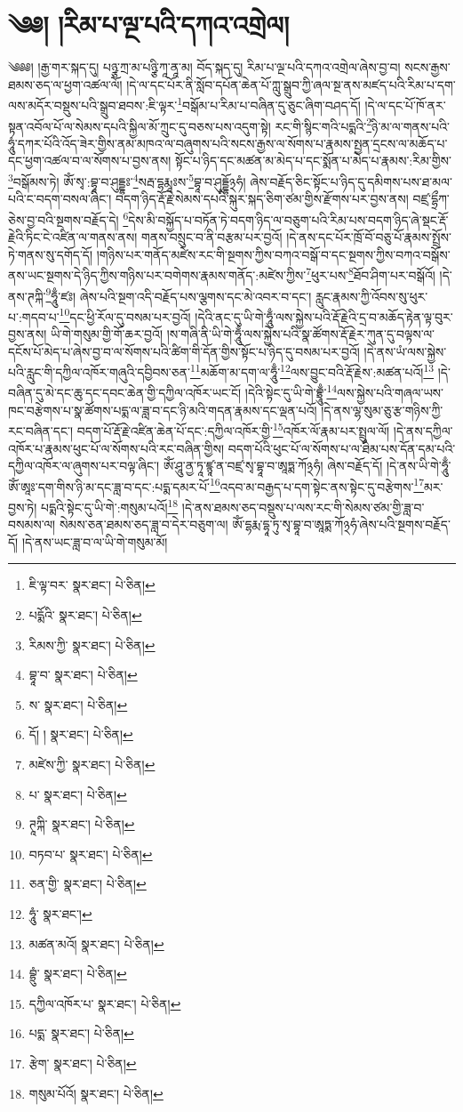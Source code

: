 \setcounter{footnote}{0} 
\chapter{༄༅། །རིམ་པ་ལྔ་པའི་དཀའ་འགྲེལ།}༄༅༅། །རྒྱ་གར་སྐད་དུ། པཉྩ་ཀྲ་མ་པཉྩི་ཀཱ་ནཱ་མ། བོད་སྐད་དུ། རིམ་པ་ལྔ་པའི་དཀའ་འགྲེལ་ཞེས་བྱ་བ། སངས་རྒྱས་ཐམས་ཅད་ལ་ཕྱག་འཚལ་ལོ། །དེ་ལ་དང་པོར་ནི་སློབ་དཔོན་ཆེན་པོ་ཀླུ་སྒྲུབ་ཀྱི་ཞལ་སྔ་ནས་མཛད་པའི་རིམ་པ་དག་ལས་མདོར་བསྡུས་པའི་སྒྲུབ་ཐབས་:ཇི་ལྟར་\footnote{ཇི་ལྟ་བར་  སྣར་ཐང་།  པེ་ཅིན། }བསྒོམ་པ་རིམ་པ་བཞིན་དུ་ཅུང་ཞིག་བཤད་དོ། །དེ་ལ་དང་པོ་ཁོ་ནར་སྟན་འབོལ་པོ་ལ་སེམས་དཔའི་སྐྱིལ་མོ་ཀྲུང་དུ་བཅས་པས་འདུག་སྟེ། རང་གི་སྙིང་གའི་པདྨའི་\footnote{པདྨོའི་  སྣར་ཐང་།  པེ་ཅིན། }ཉི་མ་ལ་གནས་པའི་ཧཱུཾ་དཀར་པོའི་འོད་ཟེར་གྱིས་ནམ་མཁའ་ལ་བཞུགས་པའི་སངས་རྒྱས་ལ་སོགས་པ་རྣམས་སྤྱན་དྲངས་ལ་མཆོད་པ་དང་ཕྱག་འཚལ་བ་ལ་སོགས་པ་བྱས་ནས། སྟོང་པ་ཉིད་དང་མཚན་མ་མེད་པ་དང་སྨོན་པ་མེད་པ་རྣམས་:རིམ་གྱིས་\footnote{རིམས་ཀྱི་  སྣར་ཐང་།  པེ་ཅིན། }བསྒོམས་ཏེ། ཨོཾ་སྭ་:བྷཱ་བ་ཤུདྡྷཿ་\footnote{བྷཱ་བ་  སྣར་ཐང་།  པེ་ཅིན། }སརྦ་དྷརྨཱཿས་\footnote{ས་  སྣར་ཐང་།  པེ་ཅིན། }བྷཱ་བ་ཤུདྡྷོ྅ཧཾ། ཞེས་བརྗོད་ཅིང་སྟོང་པ་ཉིད་དུ་དམིགས་པས་ཐ་མལ་པའི་ང་བདག་བསལ་ཞིང་། བདག་ཉིད་རྡོ་རྗེ་སེམས་དཔའི་སྐུར་སྐད་ཅིག་ཙམ་གྱིས་རྫོགས་པར་བྱས་ནས། བཛྲ་དྷྲྀཀ་ཅེས་བྱ་བའི་སྔགས་བརྗོད་དེ། \footnote{དོ། །   སྣར་ཐང་།  པེ་ཅིན། }དེས་མི་བསྐྱོད་པ་བཏོན་ཏེ་བདག་ཉིད་ལ་བཅུག་པའི་རིམ་པས་བདག་ཉིད་ཞེ་སྡང་རྡོ་རྗེའི་ཏིང་ངེ་འཛིན་ལ་གནས་ནས། གནས་བསྲུང་བ་ནི་བརྩམ་པར་བྱའོ། །དེ་ནས་དང་པོར་ཁྲོ་བོ་བཅུ་པོ་རྣམས་སྤྲོས་ཏེ་གནས་སུ་དགོད་དོ། །གཉིས་པར་གནོད་མཛེས་རང་གི་སྔགས་ཀྱིས་བཀའ་བསྒོ་བ་དང་སྔགས་ཀྱིས་བཀའ་བསྒོས་ནས་ཡང་སྔགས་དེ་ཉིད་ཀྱིས་གཉིས་པར་བགེགས་རྣམས་གནོད་:མཛེས་ཀྱིས་\footnote{མཛེས་ཀྱི་  སྣར་ཐང་།  པེ་ཅིན། }ཕུར་པས་\footnote{པ་  སྣར་ཐང་།  པེ་ཅིན། }ཐོབ་ཤིག་པར་བསྒོའོ། །དེ་ནས་ཊཀྐི་\footnote{ཊཱཀྐི་  སྣར་ཐང་།  པེ་ཅིན། }ཧཱུྃ་ཛཿ། ཞེས་པའི་སྔག་འདི་བརྗོད་པས་ལྕགས་དང་མེ་འབར་བ་དང་། རླུང་རྣམས་ཀྱི་འོབས་སུ་ཕུར་པ་:གདབ་པ་\footnote{བཏབ་པ་  སྣར་ཐང་།  པེ་ཅིན། }དང་ཕྱི་རོལ་དུ་བསམ་པར་བྱའོ། །དེའི་ནང་དུ་ཡི་གེ་ཧཱུྃ་ལས་སྐྱེས་པའི་རྡོ་རྗེའི་དྲ་བ་མཆོད་རྟེན་ལྟ་བུར་བྱས་ནས། ཡི་གེ་གསུམ་གྱི་གོ་ཆར་བྱའོ། །ས་གཞི་ནི་ཡི་གེ་ཧཱུྃ་ལས་སྐྱེས་པའི་སྣ་ཚོགས་རྡོ་རྗེར་ཀུན་དུ་བལྟས་ལ་དངོས་པོ་མེད་པ་ཞེས་བྱ་བ་ལ་སོགས་པའི་ཚིག་གི་དོན་གྱིས་སྟོང་པ་ཉིད་དུ་བསམ་པར་བྱའོ། །དེ་ནས་ཡཾ་ལས་སྐྱེས་པའི་རླུང་གི་དཀྱིལ་འཁོར་གཞུའི་དབྱིབས་ཅན་\footnote{ཅན་གྱི་  སྣར་ཐང་།  པེ་ཅིན། }མཆོག་མ་དག་ལ་ཧཱུྃ་\footnote{ཧཱུཾ་  སྣར་ཐང་། }ལས་བྱུང་བའི་རྡོ་རྗེས་:མཚན་པའོ།\footnote{མཚན་མའོ།  སྣར་ཐང་།  པེ་ཅིན། } །དེ་བཞིན་དུ་མེ་དང་ཆུ་དང་དབང་ཆེན་གྱི་དཀྱིལ་འཁོར་ཡང་ངོ། །དེའི་སྟེང་དུ་ཡི་གེ་བྷྲཱུྃ་\footnote{བྷྲུཾ་  སྣར་ཐང་།  པེ་ཅིན། }ལས་སྐྱེས་པའི་གཞལ་ཡས་ཁང་བརྩེགས་པ་སྣ་ཚོགས་པདྨ་ལ་ཟླ་བ་དང་ཉི་མའི་གདན་རྣམས་དང་ལྡན་པའོ། །དེ་ནས་ལྷ་སུམ་ཅུ་རྩ་གཉིས་ཀྱི་རང་བཞིན་དང་། བདག་པོ་རྡོ་རྗེ་འཛིན་ཆེན་པོ་དང་:དཀྱིལ་འཁོར་གྱི་\footnote{དཀྱིལ་འཁོར་པ་  སྣར་ཐང་།  པེ་ཅིན། }འཁོར་ལོ་རྣམ་པར་སྤྲུལ་ལོ། །དེ་ནས་དཀྱིལ་འཁོར་པ་རྣམས་ཕུང་པོ་ལ་སོགས་པའི་རང་བཞིན་གྱིས། བདག་པོའི་ཕུང་པོ་ལ་སོགས་པ་ལ་ཐིམ་པས་དོན་དམ་པའི་དཀྱིལ་འཁོར་ལ་ཞུགས་པར་བལྟ་ཞིང་། ཨོཾ་ཤཱུ་ནྱ་ཏཱ་ཛྙཱ་ན་བཛྲ་སྭ་བྷཱ་བ་ཨཱཏྨ་ཀོ྅ཧཾ། ཞེས་བརྗོད་དོ། །དེ་ནས་ཡི་གེ་ཧཱུྃ་ཨོཾ་ཨཱཿ་དག་གིས་ཉི་མ་དང་ཟླ་བ་དང་:པདྨ་དམར་པོ་\footnote{པདྨ་  སྣར་ཐང་།  པེ་ཅིན། }འདབ་མ་བརྒྱད་པ་དག་སྟེང་ནས་སྟེང་དུ་བརྩེགས་\footnote{རྩེག་  སྣར་ཐང་།  པེ་ཅིན། }མར་བྱས་ཏེ། པདྨའི་སྟེང་དུ་ཡི་གེ་:གསུམ་པའོ།\footnote{གསུམ་པོའོ།  སྣར་ཐང་།  པེ་ཅིན། } །དེ་ནས་ཐམས་ཅད་བསྡུས་པ་ལས་རང་གི་སེམས་ཙམ་གྱི་ཟླ་བ་བསམས་ལ། སེམས་ཅན་ཐམས་ཅད་ཟླ་བ་དེར་བཅུག་ལ། ཨོཾ་དྷརྨ་དྷཱ་ཏུ་སྭ་བྷཱ་བ་ཨཱཏྨ་ཀོ྅ཧཾ་ཞེས་པའི་སྔགས་བརྗོད་དོ། །དེ་ནས་ཡང་ཟླ་བ་ལ་ཡི་གེ་གསུམ་མོ། 